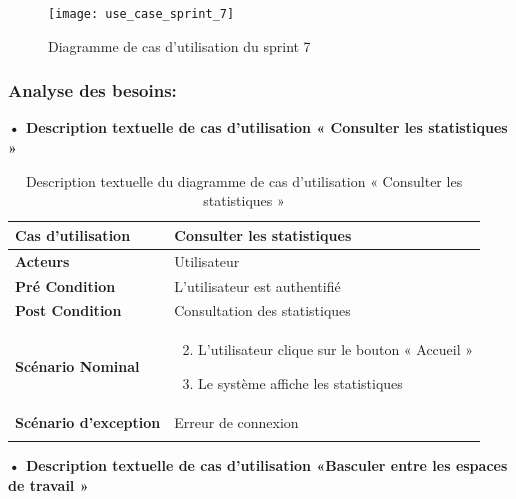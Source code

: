 \begin{figure}[H]
  \centering
  \texttt{[image: use\_case\_sprint\_7]}
  \caption{Diagramme de cas d'utilisation du sprint 7}
  \label{fig:UseCaseDiagramSp71}
\end{figure}

\subsubsection{Analyse des besoins:}
\textbf{•	Description textuelle de cas d'utilisation « Consulter les statistiques »}

\begin{longtable}{|p{5cm}|p{10cm}|}
\hline
\textbf{Cas d'utilisation}&Consulter les statistiques\\
\hline
\textbf{Acteurs}&Utilisateur\\
\hline
\textbf{Pré Condition}&L'utilisateur est authentifié\\
\hline
\textbf{Post Condition}&Consultation des statistiques\\
\hline
\textbf{Scénario Nominal}&
\vspace{-\baselineskip}
\begin{enumerate}
  \setcounter{enumi}{1}
      \item L'utilisateur clique sur le bouton « Accueil »
      \item  Le système affiche les statistiques
\end{enumerate}\\
\hline
\textbf{Scénario d'exception}&Erreur de connexion\\
\hline
\caption{Description textuelle du diagramme de cas d'utilisation « Consulter les statistiques »}
\label{tab:use_case_consulter_statistiques}
\end{longtable}

\textbf{•	Description textuelle de cas d'utilisation «Basculer entre les espaces de travail »}

